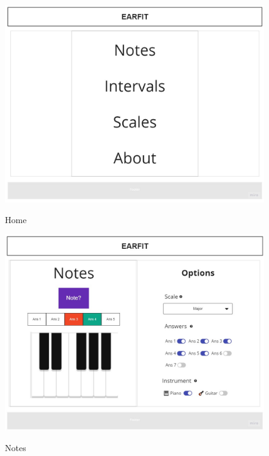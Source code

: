\documentclass[12pt,twoside,titlepage]{report}
\begin{document}
{\begin{figure}[H]
    \centering
    \includegraphics[scale=0.3]{Design Thinking/Prototipo/Medium/Menu}
    \label{fig:Menu}
    \caption{Home}
\end{figure}

\begin{figure}[H]
    \centering
    \includegraphics[scale=0.3]{Design Thinking/Prototipo/Medium/Notes}
    \label{fig:Notes}
    \caption{Notes}
\end{figure}

}
\end{document}
